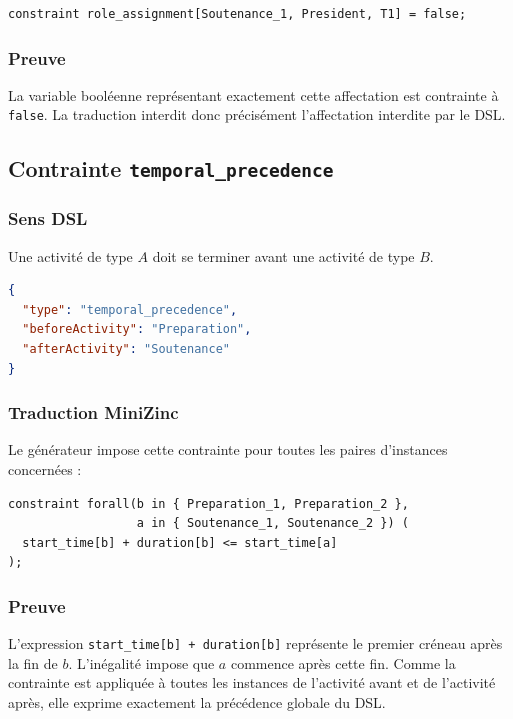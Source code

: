 \documentclass[12pt,a4paper]{article}
\begin{document}
\begin{lstlisting}[language=MiniZinc]
constraint role_assignment[Soutenance_1, President, T1] = false;
\end{lstlisting}

\subsubsection*{Preuve}

La variable booléenne représentant exactement cette affectation est contrainte à \texttt{false}. La traduction interdit donc précisément l'affectation interdite par le DSL.

\subsection{Contrainte \texttt{temporal\_precedence}}

\subsubsection*{Sens DSL}

Une activité de type $A$ doit se terminer avant une activité de type $B$.

\begin{lstlisting}[language=JSON]
{
  "type": "temporal_precedence",
  "beforeActivity": "Preparation",
  "afterActivity": "Soutenance"
}
\end{lstlisting}

\subsubsection*{Traduction MiniZinc}

Le générateur impose cette contrainte pour toutes les paires d'instances concernées :

\begin{lstlisting}[language=MiniZinc]
constraint forall(b in { Preparation_1, Preparation_2 },
                  a in { Soutenance_1, Soutenance_2 }) (
  start_time[b] + duration[b] <= start_time[a]
);
\end{lstlisting}

\subsubsection*{Preuve}

L'expression \texttt{start\_time[b] + duration[b]} représente le premier créneau après la fin de $b$. L'inégalité impose que $a$ commence après cette fin. Comme la contrainte est appliquée à toutes les instances de l'activité avant et de l'activité après, elle exprime exactement la précédence globale du DSL.
\end{document}
